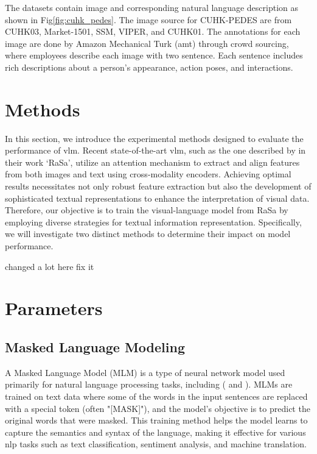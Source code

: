 The datasets contain image and corresponding natural language description as shown in Fig\ref{fig:cuhk_pedes}. The image source for CUHK-PEDES are from CUHK03, Market-1501, SSM, VIPER, and CUHK01. The annotations for each image are done by Amazon Mechanical Turk (\acrshort{amt}) through crowd sourcing, where employees describe each image with two sentence. Each sentence includes rich descriptions about a person's appearance, action poses, and interactions.

\section{Methods}
In this section, we introduce the experimental methods designed to evaluate the performance of \acrshort{vlm}. Recent state-of-the-art \acrshort{vlm}, such as the one described by \cite{Bai2023RaSaRA} in their work `RaSa', utilize an attention mechanism to extract and align features from both images and text using cross-modality encoders. Achieving optimal results necessitates not only robust feature extraction but also the development of sophisticated textual representations to enhance the interpretation of visual data. Therefore, our objective is to train the visual-language model from RaSa by employing diverse strategies for textual information representation. Specifically, we will investigate two distinct methods to determine their impact on model performance.


{\color{red} changed a lot here fix it}
\section{Parameters}
\subsection{Masked Language Modeling} 
A Masked Language Model (MLM) is a type of neural network model used primarily for natural language processing tasks, including (\cite{devlin2018bert} and \cite{Bai2023RaSaRA}). MLMs are trained on text data where some of the words in the input sentences are replaced with a special token (often "[MASK]"), and the model's objective is to predict the original words that were masked. This training method helps the model learns to capture the semantics and syntax of the language, making it effective for various \acrshort{nlp} tasks such as text classification, sentiment analysis, and machine translation.

